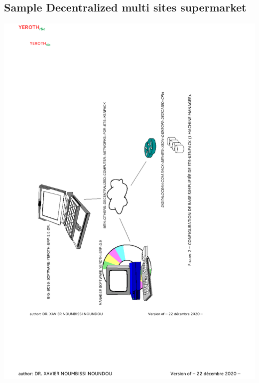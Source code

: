 \newpage

\subsection{Sample Decentralized multi sites supermarket}

\begin{center}
\includegraphics[scale=0.81]{images/yeroth-sample-decentralized-multi-sites-supermarket.pdf}
\label{fig:sample-decentralized-multi-sites-supermarket}
\end{center}
